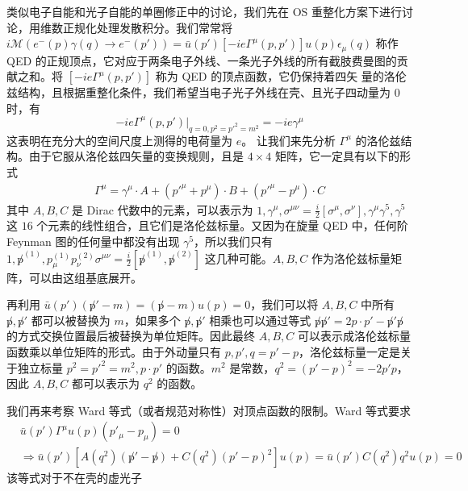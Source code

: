 

类似电子自能和光子自能的单圈修正中的讨论，我们先在 OS 重整化方案下进行讨论，用维数正规化处理发散积分。我们常常将 $i\mathcal{M}(e^-(p)\gamma(q)\rightarrow e^-(p'))=\bar u(p') [-ie\Gamma^\mu(p,p')]u(p) \epsilon_\mu(q)$ 称作 QED 的正规顶点，它对应于两条电子外线、一条光子外线的所有截肢费曼图的贡献之和。将 $[-ie\Gamma^\mu(p,p')]$ 称为 QED 的顶点函数，它仍保持着四矢
量的洛伦兹结构，且根据重整化条件，我们希望当电子光子外线在壳、且光子四动量为 $0$ 时，有
\begin{equation}
-ie\Gamma^\mu(p,p')|_{q=0,p^2={p'}^2=m^2} = -ie\gamma^\mu
\end{equation}
这表明在充分大的空间尺度上测得的电荷量为 $e$。
让我们来先分析 $\Gamma^\mu$ 的洛伦兹结构。由于它服从洛伦兹四矢量的变换规则，且是 $4\times 4$ 矩阵，它一定具有以下的形式
\begin{equation}
\begin{aligned}
\Gamma^\mu=\gamma^\mu\cdot A + ({p'}^\mu + p^\mu)\cdot B + ({p'}^\mu - p^\mu) \cdot C
\end{aligned}
\end{equation}
其中 $A,B,C$ 是 Dirac 代数中的元素，可以表示为 $1,\gamma^\mu,\sigma^{\mu\nu}=\frac{i}{2}[\sigma^\mu,\sigma^\nu],\gamma^\mu\gamma^5,\gamma^5$ 这 $16$ 个元素的线性组合，且它们是洛伦兹标量。又因为在旋量 QED 中，任何阶 Feynman 图的任何量中都没有出现 $\gamma^5$，所以我们只有 $1,\not p^{(1)},p_\mu^{(1)} p_\nu^{(2)} \sigma^{\mu\nu}=\frac{i}{2}[\not p^{(1)},\not p^{(2)}]$ 这几种可能。$A,B,C$ 作为洛伦兹标量矩阵，可以由这组基底展开。

再利用 $\bar u(p')(\not p'-m)= (\not p-m)u(p)=0$，我们可以将 $A,B,C$ 中所有 $\not p,\not p'$ 都可以被替换为 $m$，如果多个 $\not p,\not p'$ 相乘也可以通过等式 $\not p\not p'=2p\cdot p'-\not p'\not p$ 的方式交换位置最后被替换为单位矩阵。因此最终 $A,B,C$ 可以表示成洛伦兹标量函数乘以单位矩阵的形式。由于外动量只有 $p,p',q=p'-p$，洛伦兹标量一定是关于独立标量 $p^2={p'}^2=m^2,p\cdot p'$ 的函数。$m^2$ 是常数，$q^2=(p'-p)^2 = -2p'p$，因此 $A,B,C$ 都可以表示为 $q^2$ 的函数。

我们再来考察 Ward 等式（或者规范对称性）对顶点函数的限制。Ward 等式要求
\begin{equation}
\begin{aligned}
&\bar u(p')\Gamma^\mu u(p) (p'_\mu-p_\mu) = 0\\
&\Rightarrow \bar u(p')\left[A(q^2)(\not p'-\not p)+ C(q^2)(p'-p)^2\right] u(p)=\bar u(p')C(q^2)q^2 u(p)=0
\end{aligned}
\end{equation}
该等式对于不在壳的虚光子